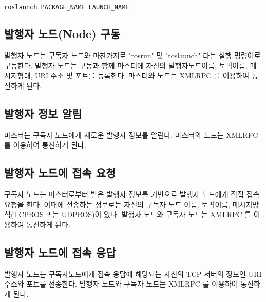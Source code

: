 \begin{lstlisting}[language=bash]
roslaunch PACKAGE_NAME LAUNCH_NAME
\end{lstlisting}

\subsection{발행자 노드(Node) 구동}

발행자 노드는 구독자 노드와 마찬가지로 "rosrun" 및 "roslaunch" 라는 실행 명령어로 구동한다. 발행자 노드는 구동과 함께 마스터에 자신의 발행자노드이름, 토픽이름, 메시지형태, URI 주소 및 포트를 등록한다. 마스터와 노드는 XMLRPC 를 이용하여 통신하게 된다.

\subsection{발행자 정보 알림}

마스터는 구독자 노드에게 새로운 발행자 정보를 알린다. 마스터와 노드는 XMLRPC 를 이용하여 통신하게 된다.

\subsection{발행자 노드에 접속 요청}

구독자 노드는 마스터로부터 받은 발행자 정보를 기반으로 발행자 노드에게 직접 접속 요청을 한다. 이때에 전송하는 정보로는 자신의 구독자 노드 이름, 토픽이름, 메시지방식(TCPROS 또는 UDPROS)이 있다. 발행자 노드와 구독자 노드는 XMLRPC 를 이용하여 통신하게 된다.

\subsection{발행자 노드에 접속 응답}

발행자 노드는 구독자노드에게 접속 응답에 해당되는 자신의 TCP 서버의 정보인 URI주소와 포트를 전송한다. 발행자 노드와 구독자 노드는 XMLRPC 를 이용하여 통신하게 된다.

